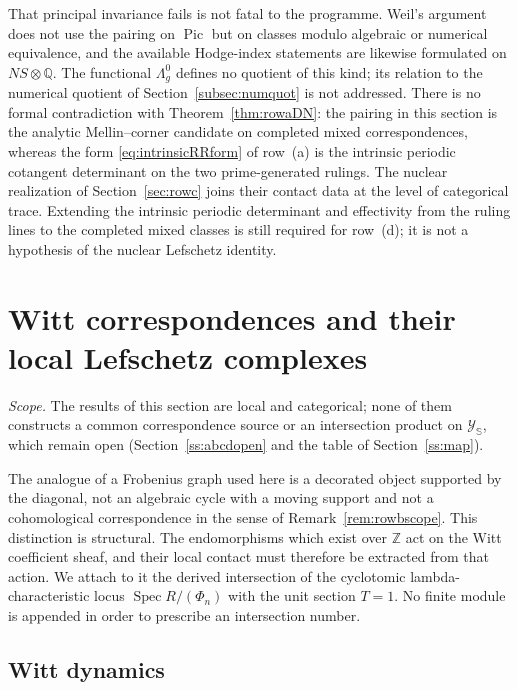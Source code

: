 \documentclass[11pt]{amsart}
\theoremstyle{definition}
\theoremstyle{remark}
\newcommand{\Z}{\mathbb Z}
\newcommand{\Q}{\mathbb Q}
\begin{document}
That principal invariance fails is not fatal to the programme.  Weil's
argument does not use the pairing on $\operatorname{Pic}$ but on classes
modulo algebraic or numerical equivalence, and the available Hodge-index
statements are likewise formulated on $NS\otimes\Q$.  The functional
$\Lambda_g^0$ defines no quotient of this kind; its relation to the numerical
quotient of Section~\ref{subsec:numquot} is not addressed.  There is no formal contradiction with
Theorem~\ref{thm:rowaDN}: the pairing in this section is the analytic
Mellin--corner candidate on completed mixed correspondences, whereas the
form \eqref{eq:intrinsicRRform} of row~(a) is the intrinsic periodic cotangent determinant on the two
prime-generated rulings.  The nuclear realization of
Section~\ref{sec:rowc} joins their contact data at the level of categorical
trace.  Extending the intrinsic periodic determinant and effectivity from
the ruling lines to the completed mixed classes is still required for
row~(d); it is not a hypothesis of the nuclear Lefschetz identity.


\section{Witt correspondences and their local Lefschetz complexes}
\noindent\emph{Scope.} The results of this section are local and
categorical; none of them constructs a common correspondence source or an
intersection product on $\mathscr Y_{\mathbb S}$, which remain open (Section~\ref{ss:abcdopen} and the table of
Section~\ref{ss:map}).

\label{sec:correspondences}

The analogue of a Frobenius graph used here is a decorated object
supported by the diagonal, not an algebraic cycle with a moving support and
not a cohomological correspondence in the sense of
Remark~\ref{rem:rowbscope}.  This distinction is structural.  The endomorphisms which
exist over $\Z$ act on the Witt coefficient sheaf, and their local contact
must therefore be extracted from that action.  We attach to it the
derived intersection of the cyclotomic lambda-characteristic locus
$\operatorname{Spec}R/(\Phi_n)$ with the unit section $T=1$.  No
finite module is appended in order to prescribe an intersection number.

\subsection{Witt dynamics}
\end{document}
